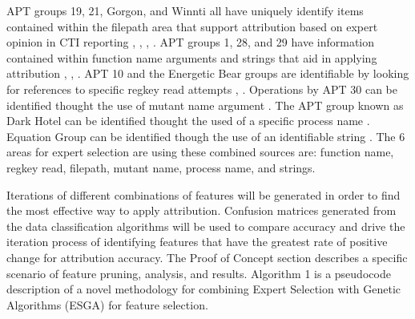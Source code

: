 \documentclass[12pt]{report}
\begin{document}
APT groups 19, 21, Gorgon, and Winnti all have uniquely identify items contained within the filepath area that support attribution based on expert opinion in CTI reporting \cite{DeepPanda2013}, \cite{ExploringBergard2016}, \cite{NewDerusbiFamily2015}, \cite{APT_Attacks2013}.  APT groups 1, 28, and 29 have information contained within function name arguments and strings that aid in applying attribution \cite{APT1Mandiant2013}, \cite{SofacyActivity2018}, \cite{DukeAPTcloudLin2015}.  APT 10 and the Energetic Bear groups are identifiable by looking for references to specific regkey read attempts \cite{OperationCloudHopperIoCs2017}, \cite{CrouchingYeti2014}.  Operations by APT 30 can be identified thought the use of mutant name argument \cite{APT30IoCs2015}.  The APT group known as Dark Hotel can be identified thought the used of a specific process name \cite{DarkHotelIoCs2014}.  Equation Group can be identified though the use of an identifiable string \cite{EquationSamples2015}.  The 6 areas for expert selection are using these combined sources are: function name, regkey read, filepath, mutant name, process name, and strings.

Iterations of different combinations of features will be generated in order to find the most effective way to apply attribution.  Confusion matrices generated from the data classification algorithms will be used to compare accuracy and drive the iteration process of identifying features that have the greatest rate of positive change for attribution accuracy.  The Proof of Concept section describes a specific scenario of feature pruning, analysis, and results.  Algorithm 1 is a pseudocode description of a novel methodology for combining Expert Selection with Genetic Algorithms (ESGA) for feature selection.
\end{document}
